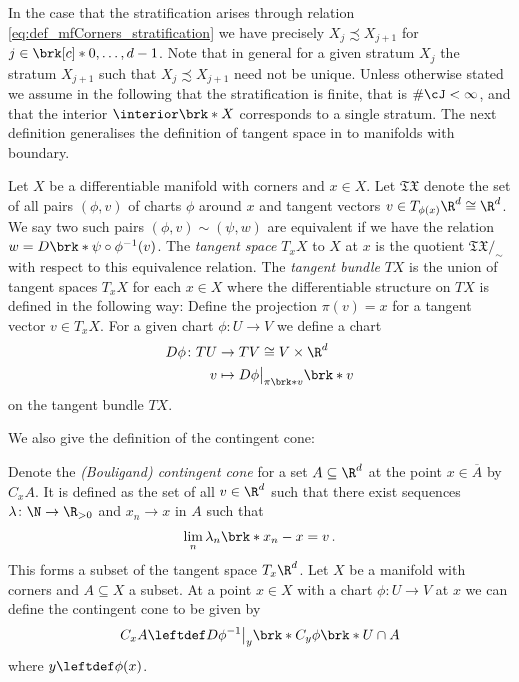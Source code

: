 In the case that the stratification arises through relation \eqref{eq:def_mfCorners_stratification}
we have precisely $X_{j}\precsim X_{j+1}$ for $j\in\brk[c]*{0,\dots,d-1}$.
Note that in general for a given stratum $X_j$ the stratum $X_{j+1}$ such that $X_j\precsim X_{j+1}$ need not be unique.
Unless otherwise stated we assume in the following that the stratification is finite, that is $\#\cJ<\infty$, and 
that the interior $\openX$ corresponds to a single stratum.
%
The next definition generalises the definition of tangent space in \cite[§1.2]{Jost2002} to manifolds with boundary.
\begin{definition}
  \label{df:tangentSpace}
  Let $X$ be a differentiable manifold with corners and $x\in X$. Let $\mathfrak{TX}$ denote the set of all
  pairs $(\phi,v)$ of charts $\phi$ around $x$ and tangent vectors
  $v\in T_{\phi(x)}\R^d\cong \R^d$. We say two such pairs $(\phi,v)\sim (\psi,w)$ are equivalent if
  we have the relation $w=D\brk*{\psi\circ\phi^{-1}}(v)$. The \emph{tangent space $T_xX$} to $X$ at $x$ is the quotient
  ${\mathfrak{TX}}\big/_{\sim}$ with respect to this equivalence relation.
  The \emph{tangent bundle} $TX$ is the union of tangent spaces $T_xX$ for each $x\in X$ where 
  the differentiable structure on $TX$ is defined in the following way:
  Define the projection $\pi(v)=x$ for a tangent vector $v\in T_xX$.
  For a given chart $\phi\colon U\to V$ we define a chart
  \begin{align*} 
    D\phi\colon TU&\to TV\cong V\times\R^d\\
    v&\mapsto D\phi\big\vert_{\pi\brk*{v}}\brk*{v}
  \end{align*}
  on the tangent bundle $TX$.
\end{definition}
We also give the definition of the contingent cone:
\begin{definition}
  \label{df:contingentCone}
  Denote the \emph{(Bouligand) contingent cone} for a set $A\subseteq \R^d$ at the point $x\in\overline{A}$ by $C_xA$.
  It is defined as the set of all $v\in\R^d$ such that there exist sequences $\lambda\colon\N\to\R_{>0}$ and $x_n\to x$ in
  $A$ such that
  $$\lim_n\lambda_n\brk*{x_n-x}=v\,.$$
  This forms a subset of the tangent space $T_x\R^d$.
  Let $X$ be a manifold with corners and $A\subseteq X$ a subset. At a point $x\in X$ with a chart $\phi\colon U\to V$ at $x$ we can define the 
  contingent cone to be given by 
  $$C_xA\leftdef D\phi^{-1}\big\vert_{y}\brk*{C_y\phi\brk*{U\cap A}}$$
  where $y\leftdef\phi(x)$.
\end{definition}
